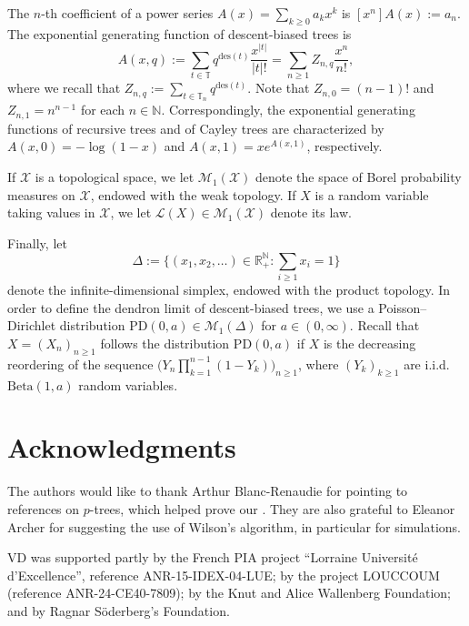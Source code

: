 \documentclass{article}
\theoremstyle{remark}
\newcommand{\bN}{\mathbb{N}}
\newcommand{\bR}{\mathbb{R}}
\newcommand{\bT}{\mathbb{T}}
\newcommand{\abs}[1]{{\left|#1\right|}}
\newcommand{\cM}{\mathcal{M}}
\newcommand{\cX}{\mathcal{X}}
\newcommand{\Law}[1]{\mathcal{L}{\left(#1\right)}}
\newcommand{\BetaDistribution}[2]{\mathrm{Beta}{\left(#1,#2\right)}}
\newcommand{\PoissonDirichlet}[2]{\mathrm{PD}{\left(#1,#2\right)}}
\newcommand{\des}[1]{{\mathrm{des}{\left(#1\right)}}}
\begin{document}
The $n$-th coefficient of a power series $A(x) = \sum_{k\ge0} a_k x^k$ is $[x^n] A(x) := a_n$.
The exponential generating function of descent-biased trees is
\begin{equation}\label{eq: def of generating function Axq}
    A(x,q) := \sum_{t\in\bT} q^\des{t} \frac{x^\abs{t}}{\abs{t}!}
    = \sum_{n\ge1} Z_{n,q} \frac{x^n}{n!},
\end{equation}
where we recall that $Z_{n,q} := \sum_{t \in \bT_n} q^\des{t}$.
Note that $Z_{n,0} = (n-1)!$ and $Z_{n,1} = n^{n-1}$ for each $n\in\bN$.
Correspondingly, the exponential generating functions of recursive trees and of Cayley trees are characterized by $A(x,0) = -\log(1-x)$ and $A(x,1) = x e^{A(x,1)}$, respectively.

If $\cX$ is a topological space, we let $\cM_1(\cX)$ denote the space of Borel probability measures on $\cX$, endowed with the weak topology.
If $X$ is a random variable taking values in $\cX$, we let $\Law{X} \in \cM_1(\cX)$ denote its law.

Finally, let 
\[
    \Delta := \Big\{ (x_1,x_2, \dots) \in \bR_+^{\bN} : \sum_{i\ge1} x_i = 1 \Big\}
\]
denote the infinite-dimensional simplex, endowed with the product topology.
In order to define the dendron limit of descent-biased trees, we use a Poisson--Dirichlet distribution $\PoissonDirichlet{0}{a} \in \cM_1(\Delta)$ for $a \in (0,\infty)$. 
Recall that $X=(X_n)_{n\ge1}$ follows the distribution $\PoissonDirichlet{0}{a}$ if $X$ is the decreasing reordering of the sequence $\big( Y_n \prod_{k=1}^{n-1}(1-Y_k) \big)_{n \geq 1}$, where $(Y_k)_{k \geq 1}$ are i.i.d.~$\BetaDistribution{1}{a}$ random variables.


\section*{Acknowledgments}

The authors would like to thank Arthur Blanc-Renaudie for pointing to references \cite{Camarri_Pitman_2000,Blanc-Renaudie_2025} on $p$-trees, which helped prove our . They are also grateful to Eleanor Archer for suggesting the use of Wilson's algorithm, in particular for simulations.

VD was supported partly by the French PIA project ``Lorraine Université d’Excellence'', reference ANR-15-IDEX-04-LUE;
by the %
project LOUCCOUM 
(reference ANR-24-CE40-7809);
by the Knut and Alice Wallenberg Foundation;
and by Ragnar Söderberg's Foundation.
\end{document}

